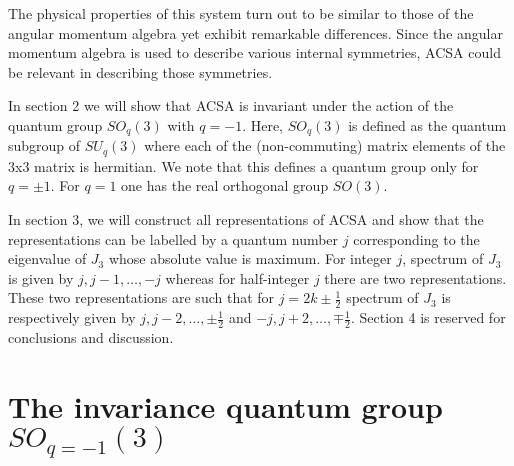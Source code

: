 The physical properties of this system turn out to be similar to
those of the angular momentum algebra yet exhibit remarkable
differences. Since the angular momentum algebra is used to
describe various internal symmetries, ACSA could be relevant in
describing those symmetries.

In section 2 we will show that ACSA is invariant under the action
of the quantum group $SO_q(3)$ with $q=-1$. Here, $SO_q(3)$ is
defined as the quantum subgroup of $SU_q(3)$ where each of the
(non-commuting) matrix elements of the $3$x$3$ matrix is
hermitian. We note that this defines a quantum group only for
$q=\pm1$. For $q=1$ one has the real orthogonal group $SO(3)$.

In section 3, we will construct all representations of ACSA and
show that the representations can be labelled by a quantum number
$j$ corresponding to the eigenvalue of $J_3$ whose absolute value
is maximum. For integer $j$, spectrum of $J_3$ is given by $j,
j-1, \ldots, -j$ whereas for half-integer $j$ there are two
representations. These two representations are such that for $j =
2k\pm\frac12$ spectrum of $J_3$ is respectively given by $j, j-2,
\ldots, \pm\frac12$ and $-j, j+2, \ldots, \mp\frac12$. Section 4
is reserved for conclusions and discussion.

\section{The invariance quantum group $SO_{q = -1}(3)$}

